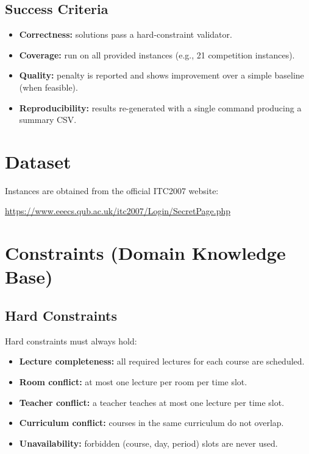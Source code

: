 \documentclass[11pt,letterpaper]{article}
\begin{document}
\subsection{Success Criteria}
\begin{itemize}[nosep]
  \item \textbf{Correctness:} solutions pass a hard-constraint validator.
  \item \textbf{Coverage:} run on all provided instances (e.g., 21 competition instances).
  \item \textbf{Quality:} penalty is reported and shows improvement over a simple baseline (when feasible).
  \item \textbf{Reproducibility:} results re-generated with a single command producing a summary CSV.
\end{itemize}

\section{Dataset}
Instances are obtained from the official ITC2007 website:
\begin{center}
\url{https://www.eeecs.qub.ac.uk/itc2007/Login/SecretPage.php}
\end{center}

\section{Constraints (Domain Knowledge Base)}
\subsection{Hard Constraints}
Hard constraints must always hold:
\begin{itemize}[nosep]
  \item \textbf{Lecture completeness:} all required lectures for each course are scheduled.
  \item \textbf{Room conflict:} at most one lecture per room per time slot.
  \item \textbf{Teacher conflict:} a teacher teaches at most one lecture per time slot.
  \item \textbf{Curriculum conflict:} courses in the same curriculum do not overlap.
  \item \textbf{Unavailability:} forbidden (course, day, period) slots are never used.
\end{itemize}
\end{document}
